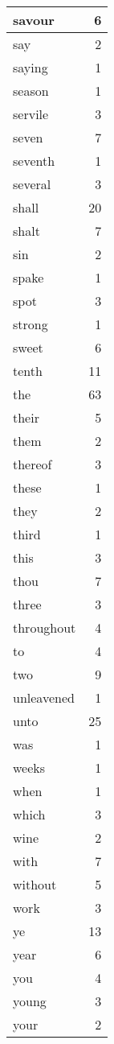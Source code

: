 \begin{center}
\begin{longtable}{l|r}
savour & 6\\ \hline 
say & 2\\ \hline 
saying & 1\\ \hline 
season & 1\\ \hline 
servile & 3\\ \hline 
seven & 7\\ \hline 
seventh & 1\\ \hline 
several & 3\\ \hline 
shall & 20\\ \hline 
shalt & 7\\ \hline 
sin & 2\\ \hline 
spake & 1\\ \hline 
spot & 3\\ \hline 
strong & 1\\ \hline 
sweet & 6\\ \hline 
tenth & 11\\ \hline 
the & 63\\ \hline 
their & 5\\ \hline 
them & 2\\ \hline 
thereof & 3\\ \hline 
these & 1\\ \hline 
they & 2\\ \hline 
third & 1\\ \hline 
this & 3\\ \hline 
thou & 7\\ \hline 
three & 3\\ \hline 
throughout & 4\\ \hline 
to & 4\\ \hline 
two & 9\\ \hline 
unleavened & 1\\ \hline 
unto & 25\\ \hline 
was & 1\\ \hline 
weeks & 1\\ \hline 
when & 1\\ \hline 
which & 3\\ \hline 
wine & 2\\ \hline 
with & 7\\ \hline 
without & 5\\ \hline 
work & 3\\ \hline 
ye & 13\\ \hline 
year & 6\\ \hline 
you & 4\\ \hline 
young & 3\\ \hline 
your & 2\\ \hline 
\end{longtable}
\end{center}




